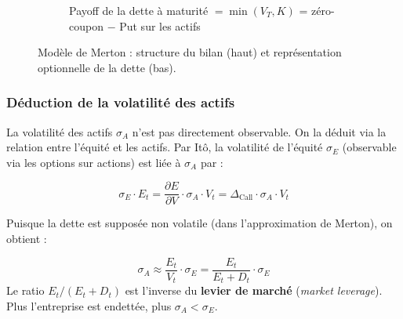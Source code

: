 \begin{figure}[htbp]
\begin{subfigure}{\textwidth}
        \caption{Payoff de la dette à maturité $= \min(V_T, K)$ = zéro-coupon $-$ Put sur les actifs}
    \end{subfigure}

    \caption{Modèle de Merton : structure du bilan (haut) et représentation optionnelle de la dette (bas).}
    \label{fig:merton_bilan}
\end{figure}

\subsubsection{Déduction de la volatilité des actifs}

La volatilité des actifs $\sigma_A$ n'est pas directement observable. On la déduit via la relation entre l'équité et les actifs. Par Itô, la volatilité de l'équité $\sigma_E$ (observable via les options sur actions) est liée à $\sigma_A$ par :

\[
\sigma_E \cdot E_t = \frac{\partial E}{\partial V} \cdot \sigma_A \cdot V_t = \Delta_{\text{Call}} \cdot \sigma_A \cdot V_t
\]

Puisque la dette est supposée non volatile (dans l'approximation de Merton), on obtient :

\begin{tcolorbox}[colback=orange!5,colframe=orange!70,title=Volatilité des actifs (approximation)]
\[
\sigma_A \approx \frac{E_t}{V_t} \cdot \sigma_E = \frac{E_t}{E_t + D_t} \cdot \sigma_E
\]
Le ratio $E_t / (E_t + D_t)$ est l'inverse du \textbf{levier de marché} (\textit{market leverage}). Plus l'entreprise est endettée, plus $\sigma_A < \sigma_E$.
\end{tcolorbox}

